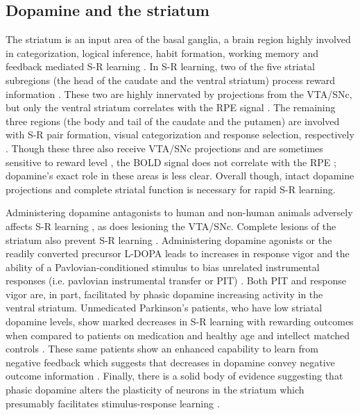 \documentclass[doc,12pt]{apa}        %
\begin{document}
\subsection{Dopamine and the striatum} %
\label{sub:dopamine_and_the_basal_ganglia}
The striatum is an input area of the basal ganglia, a brain region highly involved in categorization, logical inference, habit formation, working memory and feedback mediated S-R learning \cite{Frank:2001p1996,Jin:2010p7199,SchmitzerTorbert:2004p5410,Seger:2008p6401,Seger:2010p7189,Yin:2006p5080}.  In S-R learning, two of the five striatal subregions (the head of the caudate and the ventral striatum) process reward information \cite{Yin:2005p5101,Yin:2008p6347,Schonberg:2009p6669}.  These two are highly innervated by projections from the VTA/SNc, but only the ventral striatum correlates with the RPE signal \cite{Haruno:2006p3979,Seger:2010p7189}.  The remaining three regions (the body and tail of the caudate and the putamen) are involved with S-R pair formation, visual categorization and response selection, respectively \cite{Seger:2008p6401,Seger:2010p7189}.  Though these three also receive VTA/SNc projections and are sometimes sensitive to reward level \cite{BischoffGrethe:2009p4570}, the BOLD signal does not correlate with the RPE \cite{Seger:2010p7189}; dopamine's exact role in these areas is less clear.  Overall though, intact dopamine projections and complete striatal function is necessary for rapid S-R learning.
   
Administering dopamine antagonists to human and non-human animals adversely affects S-R learning \cite{Pizzagalli:2010p7205}, as does lesioning the VTA/SNc.  Complete lesions of the striatum also prevent S-R learning \cite{Packard:2002p5074}.  Administering dopamine agonists or the readily converted precursor L-DOPA leads to increases in response vigor and the ability of a Pavlovian-conditioned stimulus to bias unrelated instrumental responses (i.e. pavlovian instrumental transfer or PIT) \cite{Winterbauer:2007p6352}. Both PIT and response vigor are, in part, facilitated by phasic dopamine increasing activity in the ventral striatum.  Unmedicated Parkinson's patients, who have low striatal dopamine levels, show marked decreases in S-R learning with rewarding outcomes when compared to patients on medication and healthy age and intellect matched controls \cite{Pizzagalli:2010p7205}.  These same patients show an enhanced capability to learn from negative feedback which suggests that decreases in dopamine convey negative outcome information \cite{Frank:2004p4709}.  Finally, there is a solid body of evidence suggesting that phasic dopamine alters the plasticity of neurons in the striatum which presumably facilitates stimulus-response learning \cite{Calabresi:2007p4284}.
\end{document}
